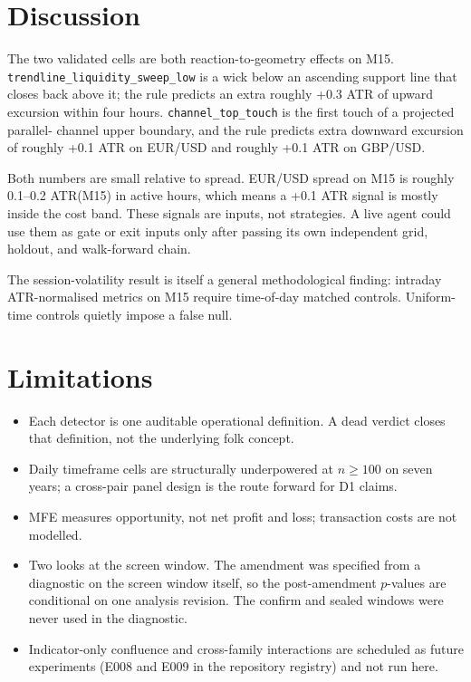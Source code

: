 \documentclass[11pt,a4paper]{article}
\begin{document}
\section{Discussion}\label{sec:disc}

The two validated cells are both reaction-to-geometry effects on M15.
\texttt{trendline\_liquidity\_sweep\_low} is a wick below an ascending
support line that closes back above it; the rule predicts an extra
roughly +0.3 ATR of upward excursion within four hours.
\texttt{channel\_top\_touch} is the first touch of a projected parallel-
channel upper boundary, and the rule predicts extra downward excursion
of roughly +0.1 ATR on EUR/USD and roughly +0.1 ATR on GBP/USD.

Both numbers are small relative to spread. EUR/USD spread on M15 is
roughly 0.1--0.2 ATR(M15) in active hours, which means a +0.1 ATR signal
is mostly inside the cost band. These signals are inputs, not
strategies. A live agent could use them as gate or exit inputs only after
passing its own independent grid, holdout, and walk-forward chain.

The session-volatility result is itself a general methodological
finding: intraday ATR-normalised metrics on M15 require time-of-day
matched controls. Uniform-time controls quietly impose a false null.

\section{Limitations}\label{sec:limits}

\begin{itemize}
  \item Each detector is one auditable operational definition. A dead
        verdict closes that definition, not the underlying folk concept.
  \item Daily timeframe cells are structurally underpowered at $n \geq
        100$ on seven years; a cross-pair panel design is the route
        forward for D1 claims.
  \item MFE measures opportunity, not net profit and loss; transaction
        costs are not modelled.
  \item Two looks at the screen window. The amendment was specified from
        a diagnostic on the screen window itself, so the post-amendment
        $p$-values are conditional on one analysis revision. The
        confirm and sealed windows were never used in the diagnostic.
  \item Indicator-only confluence and cross-family interactions are
        scheduled as future experiments (E008 and E009 in the
        repository registry) and not run here.
\end{itemize}
\end{document}
